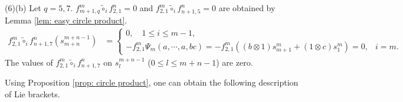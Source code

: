 \documentclass[10pt, reqno]{amsart}
\theoremstyle{definition}
\theoremstyle{remark}
\numberwithin{equation}{section}
\begin{document}
(6)(b) Let $q= 5,7$. \(f_{m+1,q}^m \tilde{\circ}_i f_{2,1}^n=0\) and \(f_{2,1}^m \tilde{\circ}_i f_{n+1,5}^n=0\) are obtained by Lemma \ref{lem: easy circle product}.
\[\begin{aligned}
    f_{2,1}^m \tilde{\circ}_i f_{n+1,7}^n(s_{m+n}^{m+n-1}) &= \begin{cases}
        0,  \quad 1\le i \le m-1,\\
       - f_{2,1}^m\Psi_m(a,\cdots,a,bc)= -f_{2,1}^m((b\otimes1)s_{m+1}^m+(1\otimes c)s_1^m)=0, &i=m.
    \end{cases}
\end{aligned}\]
The values of \(f_{2,1}^m \tilde{\circ}_i f_{n+1,7}^n\) on \(s_l^{m+n-1}\) (\(0\le l \le m+n-1\)) are zero.
\fi

Using Proposition \ref{prop: circle product}, one can obtain the following description of Lie brackets.
\end{document}
